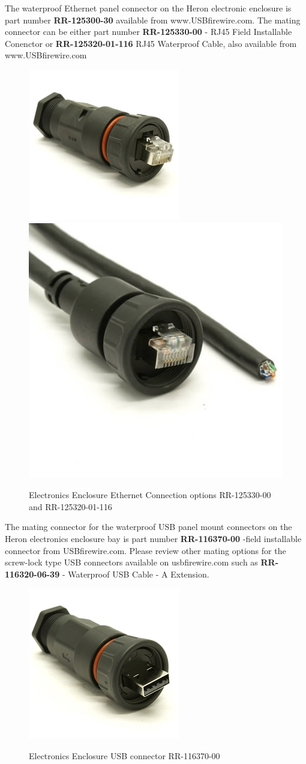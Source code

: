 \documentclass[]{clearpath-latex/clearpath-manual}
\begin{document}
The waterproof Ethernet panel connector on the Heron electronic enclosure is part number \textbf{RR-125300-30} available from www.USBfirewire.com. The mating connector can be either part number \textbf{RR-125330-00} - RJ45 Field Installable Conenctor or \textbf{RR-125320-01-116} RJ45 Waterproof Cable, also available from www.USBfirewire.com




\begin{figure}[h]
  \centering
  \includegraphics[width=0.25\linewidth]{RR-125330-00.jpg}
  \includegraphics[width=0.25\linewidth]{RR-125320-02-XX.jpg}
  
  \label{h_eth1}
  \caption{Electronics Enclosure Ethernet Connection options RR-125330-00 and RR-125320-01-116}
\end{figure}

The mating connector for the waterproof USB panel mount connectors on the Heron electronics enclosure bay is part number \textbf{RR-116370-00} -field installable connector from USBfirewire.com. Please review other mating options for the screw-lock type USB connectors available on usbfirewire.com such as \textbf{RR-116320-06-39} - Waterproof USB Cable - A Extension.

\begin{figure}[h]
  \centering
  \includegraphics[width=0.25\linewidth]{RR-116370-00.jpg}
  \label{h_usb0}
  \caption{Electronics Enclosure USB connector RR-116370-00}
\end{figure}
\end{document}
